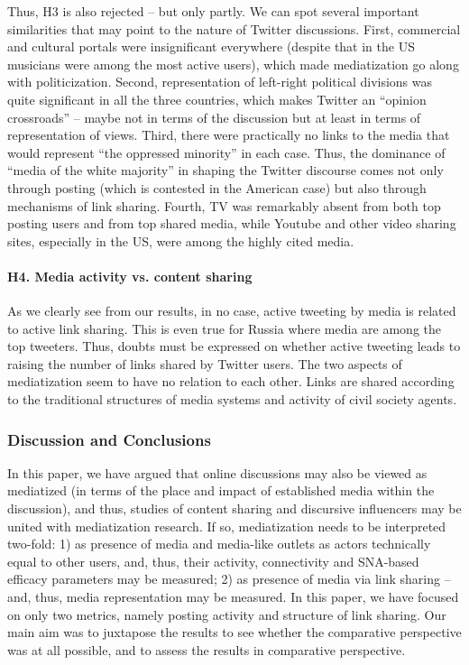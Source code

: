 Thus, H3 is also rejected -- but only partly. We can spot several important similarities that may point to the nature of Twitter discussions. First, commercial and cultural portals were insignificant everywhere (despite that in the US musicians were among the most active users), which made mediatization go along with politicization. Second, representation of left-right political divisions was quite significant in all the three countries, which makes Twitter an “opinion crossroads” -- maybe not in terms of the discussion but at least in terms of representation of views. Third, there were practically no links to the media that would represent “the oppressed minority” in each case. Thus, the dominance of “media of the white majority” in shaping the Twitter discourse comes not only through posting (which is contested in the American case) but also through mechanisms of link sharing. Fourth, TV was remarkably absent from both top posting users and from top shared media, while Youtube and other video sharing sites, especially in the US, were among the highly cited media.

\paragraph{H4. Media activity vs. content sharing}
As we clearly see from our results, in no case, active tweeting by media is related to active link sharing. This is even true for Russia where media are among the top tweeters. Thus, doubts must be expressed on whether active tweeting leads to raising the number of links shared by Twitter users. The two aspects of mediatization seem to have no relation to each other. Links are shared according to the traditional structures of media systems and activity of civil society agents.

\subsubsection{Discussion and Conclusions}

In this paper, we have argued that online discussions may also be viewed as mediatized (in terms of the place and impact of established media within the discussion), and thus, studies of content sharing and discursive influencers may be united with mediatization research. If so, mediatization needs to be interpreted two-fold: 1) as presence of media and media-like outlets as actors technically equal to other users, and, thus, their activity, connectivity and SNA-based efficacy parameters may be measured; 2) as presence of media via link sharing -- and, thus, media representation may be measured. In this paper, we have focused on only two metrics, namely posting activity and structure of link sharing. Our main aim was to juxtapose the results to see whether the comparative perspective was at all possible, and to assess the results in comparative perspective.

